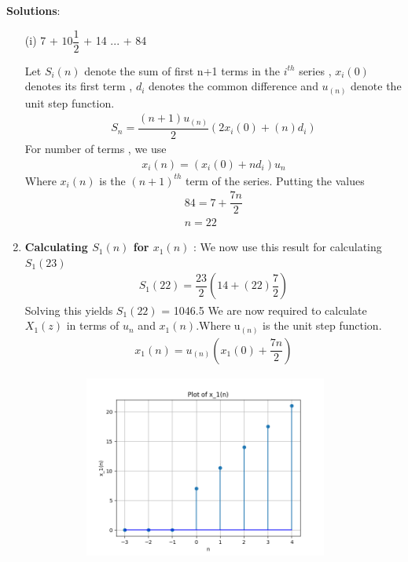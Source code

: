 \documentclass[journal,12pt,twocolumn]{IEEEtran}
\theoremstyle{remark}
\begin{document}
\vspace{0.5cm}
\textbf{Solutions}:
\begin{enumerate}
\item[(i)]   
7 + $10\dfrac{1}{2}$ + 14 ... + 84\vspace{0.05cm}
\vspace{0.2cm}

Let $S_i{(n)}$ denote the sum of first n+1 terms in the $i^{th}$ series , $x_i(0)$ denotes its first term , $d_i$ denotes the common difference and $u_{(n)}$ denote the unit step function.
\begin{align}
{S_n} = \dfrac{(n+1)u_{(n)}}{2}(2x_i(0) + (n)d_i)\label{eq:1}
\end{align}
For number of terms , we use
\begin{align}
x_i(n) = (x_i(0) + nd_i)u_n\label{eq:2}
\end{align}
Where $x_i(n)$ is the $(n+1)^{th}$ term of the series. Putting the values
\begin{align}  
84 = 7+\dfrac{7n}{2}\\
n=22
\end{align}
\item 
\textbf{Calculating $S_1(n)$ for $x_1(n)$} : 
We now use this result for calculating $S_1(23)$
\begin{align}
    S_1{(22)} = \dfrac{23}{2}(14+(22)\dfrac{7}{2})
    \end{align}
Solving this yields $S_1{(22)}$ = 1046.5\vspace{0.05cm}\vspace{0.05cm}
We are now required to calculate $X_1(z)$ in terms of $u_n$ and $x_1(n)$.Where u$_{(n)}$ is the unit step function.
\begin{align}
    x_1(n) = u_{(n)}(x_1(0)+\dfrac{7n}{2})
    \end{align}
    \begin{figure}[!ht]
    \centering
\graphicspath{ {figs/} }
\includegraphics[width=10cm, height=6cm]{graph_1}

\end{figure}
\end{enumerate}
\end{document}
